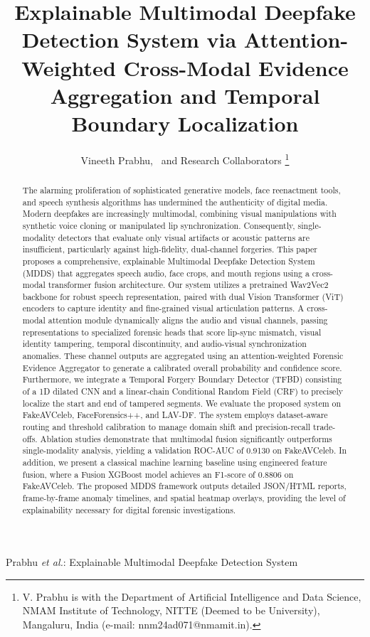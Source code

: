 \documentclass[journal,10pt,onecolumn,draftclsnofoot]{IEEEtran}
\begin{document}
\title{Explainable Multimodal Deepfake Detection System via Attention-Weighted Cross-Modal Evidence Aggregation and Temporal Boundary Localization}

\author{Vineeth Prabhu,~
        and Research Collaborators
\thanks{V. Prabhu is with the Department of Artificial Intelligence and Data Science, NMAM Institute of Technology, NITTE (Deemed to be University), Mangaluru, India (e-mail: nnm24ad071@nmamit.in).}}

%
{Prabhu \MakeLowercase{\textit{et al.}}: Explainable Multimodal Deepfake Detection System}

\maketitle

\begin{abstract}
The alarming proliferation of sophisticated generative models, face reenactment tools, and speech synthesis algorithms has undermined the authenticity of digital media. Modern deepfakes are increasingly multimodal, combining visual manipulations with synthetic voice cloning or manipulated lip synchronization. Consequently, single-modality detectors that evaluate only visual artifacts or acoustic patterns are insufficient, particularly against high-fidelity, dual-channel forgeries. This paper proposes a comprehensive, explainable Multimodal Deepfake Detection System (MDDS) that aggregates speech audio, face crops, and mouth regions using a cross-modal transformer fusion architecture. Our system utilizes a pretrained Wav2Vec2 backbone for robust speech representation, paired with dual Vision Transformer (ViT) encoders to capture identity and fine-grained visual articulation patterns. A cross-modal attention module dynamically aligns the audio and visual channels, passing representations to specialized forensic heads that score lip-sync mismatch, visual identity tampering, temporal discontinuity, and audio-visual synchronization anomalies. These channel outputs are aggregated using an attention-weighted Forensic Evidence Aggregator to generate a calibrated overall probability and confidence score. Furthermore, we integrate a Temporal Forgery Boundary Detector (TFBD) consisting of a 1D dilated CNN and a linear-chain Conditional Random Field (CRF) to precisely localize the start and end of tampered segments. We evaluate the proposed system on FakeAVCeleb, FaceForensics++, and LAV-DF. The system employs dataset-aware routing and threshold calibration to manage domain shift and precision-recall trade-offs. Ablation studies demonstrate that multimodal fusion significantly outperforms single-modality analysis, yielding a validation ROC-AUC of 0.9130 on FakeAVCeleb. In addition, we present a classical machine learning baseline using engineered feature fusion, where a Fusion XGBoost model achieves an F1-score of 0.8806 on FakeAVCeleb. The proposed MDDS framework outputs detailed JSON/HTML reports, frame-by-frame anomaly timelines, and spatial heatmap overlays, providing the level of explainability necessary for digital forensic investigations.
\end{abstract}
\end{document}
